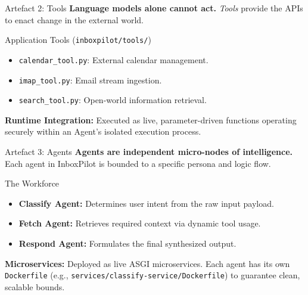 \documentclass[aspectratio=169, xcolor=table]{beamer}
\begin{document}
\begin{frame}{Artefact 2: Tools}
    \textbf{Language models alone cannot act.} \textit{Tools} provide the APIs to enact change in the external world.
    
    \vspace{0.3cm}
    \begin{block}{Application Tools (\texttt{inboxpilot/tools/})}
        \begin{itemize}
            \item \texttt{calendar\_tool.py}: External calendar management.
            \item \texttt{imap\_tool.py}: Email stream ingestion.
            \item \texttt{search\_tool.py}: Open-world information retrieval.
        \end{itemize}
    \end{block}
    
    \vspace{0.2cm}
    \textbf{Runtime Integration:} Executed as live, parameter-driven functions operating securely within an Agent's isolated execution process.
\end{frame}

\begin{frame}{Artefact 3: Agents}
    \textbf{Agents are independent micro-nodes of intelligence.} Each agent in InboxPilot is bounded to a specific persona and logic flow.
    
    \vspace{0.3cm}
    \begin{block}{The Workforce}
        \begin{itemize}
            \item \textbf{Classify Agent:} Determines user intent from the raw input payload.
            \item \textbf{Fetch Agent:} Retrieves required context via dynamic tool usage.
            \item \textbf{Respond Agent:} Formulates the final synthesized output.
        \end{itemize}
    \end{block}
    
    \vspace{0.2cm}
    \textbf{Microservices:} Deployed as live ASGI microservices. Each agent has its own \texttt{Dockerfile} (e.g., \texttt{services/classify-service/Dockerfile}) to guarantee clean, scalable bounds.
\end{frame}
\end{document}

